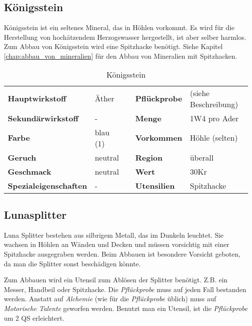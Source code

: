 \subsection{Königsstein}
\label{chap:koenigsstein}
Königsstein ist ein seltenes Mineral, das in Höhlen vorkommt. Es wird für die Herstellung von hochätzendem Herzogswasser hergestellt, ist aber selber harmlos. Zum Abbau von Königsstein wird eine Spitzhacke benötigt. Siehe Kapitel \ref{chap:abbau_von_mineralien} für den Abbau von Mineralien mit Spitzhacken.

\begin{table}[h] 
\begin{center} 
\begin{tabular}{|l|l|p{1cm}|l|l|} 
  	\cline{1-2} \cline{4-5} 
  	\textbf{Hauptwirkstoff} & Äther && \textbf{Pflückprobe} & (siehe Beschreibung) \\ \cline{1-2} \cline{4-5} 
  	\textbf{Sekundärwirkstoff} & - && \textbf{Menge} & 1W4 pro Ader \\ \cline{1-2} \cline{4-5} 
  	\textbf{Farbe} & blau (1) && \textbf{Vorkommen} & Höhle (selten) \\ \cline{1-2} \cline{4-5} 
  	\textbf{Geruch} & neutral && \textbf{Region} & überall \\ \cline{1-2} \cline{4-5} 
  	\textbf{Geschmack} & neutral && \textbf{Wert} & 30Kr \\ \cline{1-2} \cline{4-5} 
  	\textbf{Spezialeigenschaften} & - && \textbf{Utensilien} & Spitzhacke \\ \cline{1-2} \cline{4-5} 
\end{tabular} 
\end{center} 
\caption{Königsstein} 
\label{tab:koenigsstein} 
\end{table}


\subsection{Lunasplitter}
Luna Splitter bestehen aus silbrigem Metall, das im Dunkeln leuchtet. Sie wachsen in Höhlen an Wänden und Decken und müssen vorsichtig mit einer Spitzhacke ausgegraben werden. Beim Abbauen ist besondere Vorsicht geboten, da man die Splitter sonst beschädigen könnte. 

Zum Abbauen wird ein Utensil zum Ablösen der Splitter benötigt. Z.B. ein Messer, Handbeil oder Spitzhacke. Die \textit{Pflückprobe} muss auf jeden Fall bestanden werden. Anstatt auf \textit{Alchemie} (wie für die \textit{Pflückprobe} üblich) muss auf \textit{Motorische Talente} geworfen werden. Benutzt man ein Utensil, ist die \textit{Pflückprobe} um 2 QS erleichtert.


